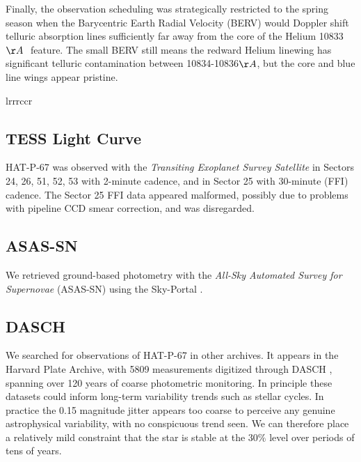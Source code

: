\documentclass[twocolumn]{aastex631}
\begin{document}
Finally, the observation scheduling was strategically restricted to the spring season when the Barycentric Earth Radial Velocity (BERV) would Doppler shift telluric absorption lines sufficiently far away from the core of the Helium 10833$\AA~$ feature.  The small BERV still means the redward Helium linewing has significant telluric contamination between 10834-10836$\AA$, but the core and blue line wings appear pristine.


\begin{deluxetable*}{lrrrccr}
    \tablewidth{0pc}
    \tabletypesize{\scriptsize}
    \startdata
    
    \enddata
\end{deluxetable*}

\subsection{TESS Light Curve}
HAT-P-67 was observed with the \emph{Transiting Exoplanet Survey Satellite} \citep[TESS][]{2014SPIE.9143E..20R} in Sectors 24, 26, 51, 52, 53 with 2-minute cadence, and in Sector 25 with 30-minute (FFI) cadence.  The Sector 25 FFI data appeared malformed, possibly due to problems with pipeline CCD smear correction, and was disregarded.

\subsection{ASAS-SN}
We retrieved ground-based photometry with the \emph{All-Sky Automated Survey for Supernovae} (ASAS-SN) using the Sky-Portal \citep{shappee14,2017PASP..129j4502K}.

\subsection{DASCH}
We searched for observations of HAT-P-67 in other archives.  It appears in the Harvard Plate Archive, with 5809 measurements digitized through DASCH , spanning over 120 years of coarse photometric monitoring.  In principle these datasets could inform long-term variability trends such as stellar cycles.  In practice the 0.15 magnitude jitter appears too coarse to perceive any genuine astrophysical variability, with no conspicuous trend seen.  We can therefore place a relatively mild constraint that the star is stable at the $30\%$ level over periods of tens of years.
\end{document}
